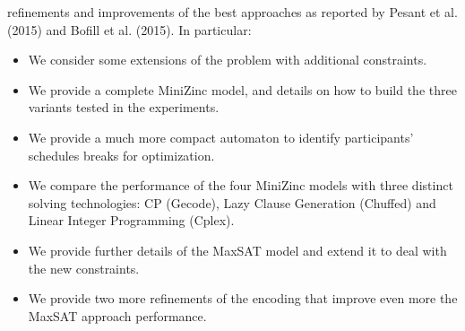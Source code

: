 \documentclass[10pt]{article}
\begin{document}
refinements and improvements of the best approaches as reported by Pesant et al. (2015) and Bofill et al. (2015). In particular:

\begin{itemize}
  \item We consider some extensions of the problem with additional constraints.
  \item We provide a complete MiniZinc model, and details on how to build the three variants tested in the experiments.
  \item We provide a much more compact automaton to identify participants' schedules breaks for optimization.
  \item We compare the performance of the four MiniZinc models with three distinct solving technologies: CP (Gecode), Lazy Clause Generation (Chuffed) and Linear Integer Programming (Cplex).
  \item We provide further details of the MaxSAT model and extend it to deal with the new constraints.
  \item We provide two more refinements of the encoding that improve even more the MaxSAT approach performance.
\end{itemize}
\end{document}
